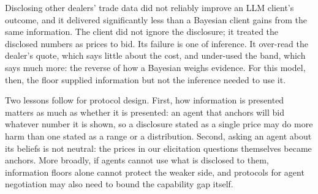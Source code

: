 \documentclass[sigconf]{acmart}
\begin{document}
Disclosing other dealers' trade data did not reliably improve an LLM client's outcome, and it delivered significantly less than a Bayesian client gains from the same information. The client did not ignore the disclosure; it treated the disclosed numbers as prices to bid. Its failure is one of inference. It over-read the dealer's quote, which says little about the cost, and under-used the band, which says much more: the reverse of how a Bayesian weighs evidence. For this model, then, the floor supplied information but not the inference needed to use it.

Two lessons follow for protocol design. First, how information is presented matters as much as whether it is presented: an agent that anchors will bid whatever number it is shown, so a disclosure stated as a single price may do more harm than one stated as a range or a distribution. Second, asking an agent about its beliefs is not neutral: the prices in our elicitation questions themselves became anchors. More broadly, if agents cannot use what is disclosed to them, information floors alone cannot protect the weaker side, and protocols for agent negotiation may also need to bound the capability gap itself.





\end{document}
